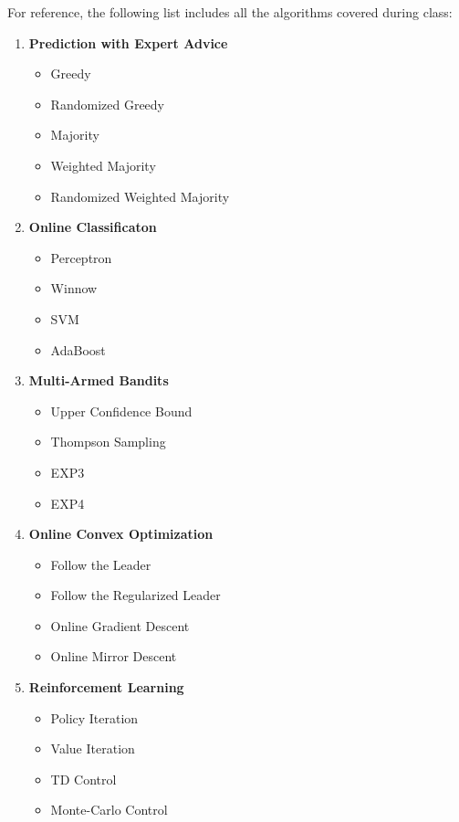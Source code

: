 \documentclass[11pt]{article}
\begin{document}
For reference, the following list includes all the algorithms covered during class:
\begin{multicols}{2}  
\begin{enumerate}
    \item \textbf{Prediction with Expert Advice}
    \begin{itemize}
        \item Greedy
        \item Randomized Greedy
        \item Majority
        \item Weighted Majority
        \item Randomized Weighted Majority 
    \end{itemize}
    \item \textbf{Online Classificaton}
    \begin{itemize}
        \item Perceptron
        \item Winnow
        \item SVM
        \item AdaBoost
    \end{itemize}
    \item \textbf{Multi-Armed Bandits}
    \begin{itemize}
        \item Upper Confidence Bound
        \item Thompson Sampling
        \item EXP3
        \item EXP4
    \end{itemize}
    \item \textbf{Online Convex Optimization}
    \begin{itemize}
        \item Follow the Leader
        \item Follow the Regularized Leader
        \item Online Gradient Descent
        \item Online Mirror Descent
    \end{itemize}
    \item \textbf{Reinforcement Learning}
    \begin{itemize}
        \item Policy Iteration
        \item Value Iteration
        \item TD Control
        \item Monte-Carlo Control

\end{itemize}
\end{enumerate}
\end{multicols}
\end{document}
